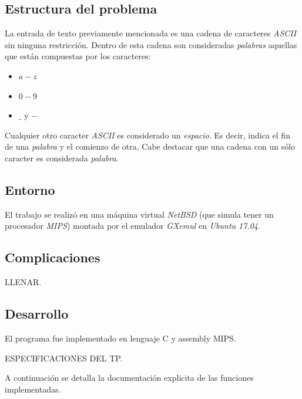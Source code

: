 \documentclass[a4paper, 10pt]{article}
\newcommand\tab[1][0.5cm]{\hspace*{#1}}
\begin{document}
		\subsection{Estructura del problema}
			La entrada de texto previamente mencionada es una cadena de caracteres \emph{ASCII}
			sin ninguna restricción. Dentro de esta cadena son consideradas \emph{palabras} aquellas
			que están compuestas por los caracteres:
			\begin{itemize}
				\item $a-z$
				\item $0-9$
				\item $\_$ y $-$
			\end{itemize}
			\tab Cualquier otro caracter \emph{ASCII} es considerado un \emph{espacio}. Es decir,
			indica el fin de una \emph{palabra} y el comienzo de otra. Cabe destacar que una cadena
			con un sólo caracter es considerada \emph{palabra}.
		\subsection{Entorno}
			El trabajo se realizó en una máquina virtual \emph{NetBSD} (que simula tener un procesador
			\emph{MIPS}) montada por el emulador \emph{GXemul} en \emph{Ubuntu 17.04}.
		\subsection{Complicaciones}
			LLENAR.
		\subsection{Desarrollo}
			El programa fue implementado en lenguaje C y assembly MIPS.
			
			ESPECIFICACIONES DEL TP.			
			
			A continuación se detalla la documentación explicita de las funciones implementadas.
\end{document}
